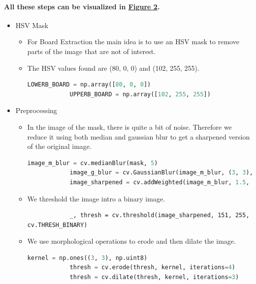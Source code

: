 \documentclass[12pt]{article}
\begin{document}
    \paragraph{All these steps can be visualized in \hyperref[fig:board-extraction-steps]{Figure 2}.}
    \begin{itemize}
        \item HSV Mask
        \begin{itemize}
            \item For Board Extraction the main idea is to use an HSV mask to remove parts of the image that are not of interest.
            \item The HSV values found are (80, 0, 0) and (102, 255, 255).
            \begin{lstlisting}[language=Python, breaklines=true, breakatwhitespace=true, basicstyle=\small]
            LOWERB_BOARD = np.array([80, 0, 0])
            UPPERB_BOARD = np.array([102, 255, 255])
            \end{lstlisting}
        \end{itemize}
        \item Preprocessing
        \begin{itemize}
            \item In the image of the mask, there is quite a bit of noise. Therefore we reduce it using both median and gaussian blur to get a sharpened version of the original image.
            \begin{lstlisting}[language=Python, breaklines=true, breakatwhitespace=true, basicstyle=\small]
            image_m_blur = cv.medianBlur(mask, 5)
            image_g_blur = cv.GaussianBlur(image_m_blur, (3, 3), 5)
            image_sharpened = cv.addWeighted(image_m_blur, 1.5, image_g_blur, -0.8, 0)
            \end{lstlisting}
            \item We threshold the image intro a binary image.
            \begin{lstlisting}
            _, thresh = cv.threshold(image_sharpened, 151, 255, cv.THRESH_BINARY)
            \end{lstlisting}
            \item We use morphological operations to erode and then dilate the image.
            \begin{lstlisting}[language=Python, breaklines=true, breakatwhitespace=true, basicstyle=\small]
            kernel = np.ones((3, 3), np.uint8)
            thresh = cv.erode(thresh, kernel, iterations=4)
            thresh = cv.dilate(thresh, kernel, iterations=3)

\end{lstlisting}
\end{itemize}
\end{itemize}
\end{document}
